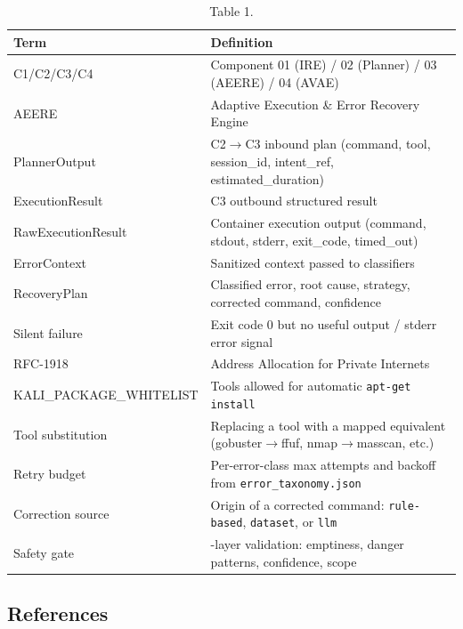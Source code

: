 \documentclass[10pt,journal,onecolumn]{IEEEtran}
\begin{document}
\begin{table}[h]
\caption{Table 1.}
\label{tab:t1}
\begin{tabularx}{\columnwidth}{l >{\raggedright\arraybackslash}X}
\toprule
\textbf{Term} & \textbf{Definition}\\
\midrule
C1/C2/C3/C4 & Component 01 (IRE) / 02 (Planner) / 03 (AEERE) / 04 (AVAE)\\
AEERE & Adaptive Execution \& Error Recovery Engine\\
PlannerOutput & C2$\rightarrow$C3 inbound plan (command, tool, session\_id, intent\_ref, estimated\_duration)\\
ExecutionResult & C3 outbound structured result\\
RawExecutionResult & Container execution output (command, stdout, stderr, exit\_code, timed\_out)\\
ErrorContext & Sanitized context passed to classifiers\\
RecoveryPlan & Classified error, root cause, strategy, corrected command, confidence\\
Silent failure & Exit code 0 but no useful output / stderr error signal\\
RFC-1918 & Address Allocation for Private Internets\\
KALI\_PACKAGE\_WHITELIST & Tools allowed for automatic \texttt{apt-get install}\\
Tool substitution & Replacing a tool with a mapped equivalent (gobuster$\rightarrow$ffuf, nmap$\rightarrow$masscan, etc.)\\
Retry budget & Per-error-class max attempts and backoff from \texttt{error\_taxonomy.json}\\
Correction source & Origin of a corrected command: \texttt{rule-based}, \texttt{dataset}, or \texttt{llm}\\
Safety gate & 4-layer validation: emptiness, danger patterns, confidence, scope\\
\bottomrule
\end{tabularx}
\end{table}

\subsection{References}
\end{document}
